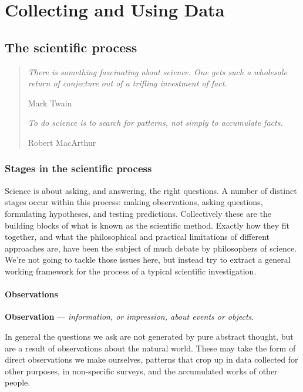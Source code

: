 \documentclass[
]{book}
\begin{document}
\hypertarget{part-collecting-and-using-data}{%
\part{Collecting and Using Data}\label{part-collecting-and-using-data}}

\hypertarget{scientific-process}{%
\chapter{The scientific process}\label{scientific-process}}

\begin{quote}
\emph{There is something fascinating about science. One gets such a wholesale return of conjecture out of a trifling investment of fact.}

Mark Twain

\emph{To do science is to search for patterns, not simply to accumulate facts.}

Robert MacArthur
\end{quote}

\hypertarget{stages-scientific-process}{%
\section{Stages in the scientific process}\label{stages-scientific-process}}

Science is about asking, and answering, the right questions. A number of distinct stages occur within this process: making observations, asking questions, formulating hypotheses, and testing predictions. Collectively these are the building blocks of what is known as the scientific method. Exactly how they fit together, and what the philosophical and practical limitations of different approaches are, have been the subject of much debate by philosophers of science. We're not going to tackle those issues here, but instead try to extract a general working framework for the process of a typical scientific investigation.

\hypertarget{stages-observations}{%
\subsection{Observations}\label{stages-observations}}

\textbf{Observation} --- \emph{information, or impression, about events or objects}.

In general the questions we ask are not generated by pure abstract thought, but are a result of observations about the natural world. These may take the form of direct observations we make ourselves, patterns that crop up in data collected for other purposes, in non-specific surveys, and the accumulated works of other people.
\end{document}
